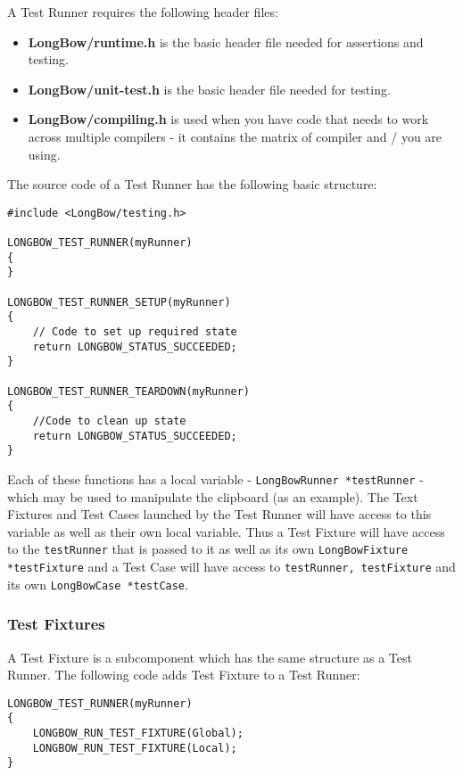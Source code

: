 A Test Runner requires the  following header files:
\begin{itemize}
\item \textbf{LongBow/runtime.h} is the basic header file needed for assertions and testing.
\item \textbf{LongBow/unit-test.h} is the basic header file needed for testing.
\item \textbf{LongBow/compiling.h} is used when you have code that needs to work across multiple compilers - it contains the matrix of compiler and / you are using.
\end{itemize} 

\noindent The source code of a Test Runner has the following basic structure:

\begin{lstlisting}
#include <LongBow/testing.h>

LONGBOW_TEST_RUNNER(myRunner)
{
}

LONGBOW_TEST_RUNNER_SETUP(myRunner)
{
    // Code to set up required state
    return LONGBOW_STATUS_SUCCEEDED;
}

LONGBOW_TEST_RUNNER_TEARDOWN(myRunner)
{
    //Code to clean up state
    return LONGBOW_STATUS_SUCCEEDED;
}

\end{lstlisting}


Each of these functions has a local variable - {\tt LongBowRunner *testRunner} - which may be used to manipulate the clipboard (as an example).  The Text Fixtures and Test Cases launched by the Test Runner will have access to this variable as well as their own local variable.  Thus a Test Fixture will have access to the {\tt  testRunner} that is passed to it as well as its own {\tt LongBowFixture *testFixture} and a Test Case will have access to {\tt testRunner, testFixture} and its own {\tt LongBowCase *testCase}.

\subsubsection{Test Fixtures}

A Test Fixture is a subcomponent which has the same structure as a Test Runner.
The following code adds Test Fixture to a Test Runner:

\begin{lstlisting}
LONGBOW_TEST_RUNNER(myRunner)
{
    LONGBOW_RUN_TEST_FIXTURE(Global);
    LONGBOW_RUN_TEST_FIXTURE(Local);
}
\end{lstlisting}


